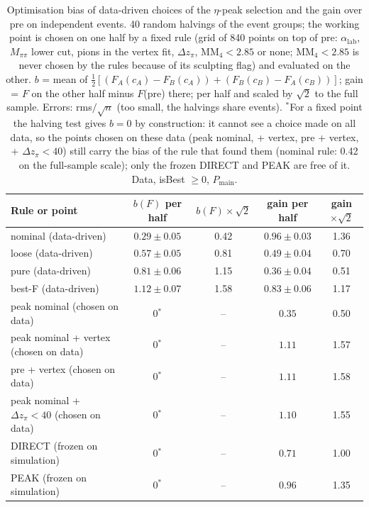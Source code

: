 \begin{table}[H]
\centering\small
\setlength{\tabcolsep}{4pt}
\caption{Optimisation bias of data-driven choices of the $\eta$-peak selection and the gain over pre on independent events. 40 random halvings of the event groups; the working point is chosen on one half by a fixed rule (grid of 840 points on top of pre: $\alpha_\mathrm{lab}$, $M_{\pi\pi}$ lower cut, pions in the vertex fit, $\Delta z_\pi$, MM$_4<2.85$ or none; MM$_4<2.85$ is never chosen by the rules because of its sculpting flag) and evaluated on the other. $b$ = mean of $\frac12[(F_A(c_A)-F_B(c_A))+(F_B(c_B)-F_A(c_B))]$; gain = $F$ on the other half minus $F$(pre) there; per half and scaled by $\sqrt2$ to the full sample. Errors: rms$/\sqrt{n}$ (too small, the halvings share events). $^*$For a fixed point the halving test gives $b=0$ by construction: it cannot see a choice made on all data, so the points chosen on these data (peak nominal, + vertex, pre + vertex, + $\Delta z_\pi<40$) still carry the bias of the rule that found them (nominal rule: 0.42 on the full-sample scale); only the frozen DIRECT and PEAK are free of it. Data, isBest $\geq0$, $P_\mathrm{main}$.}
\label{tab:opt_bias}
\begin{tabular}{lcccc}
\toprule
Rule or point & $b(F)$ per half & $b(F)\times\sqrt2$ & gain per half & gain $\times\sqrt2$ \\
\midrule
nominal (data-driven) & $0.29\pm0.05$ & 0.42 & $0.96\pm0.03$ & 1.36 \\
loose (data-driven) & $0.57\pm0.05$ & 0.81 & $0.49\pm0.04$ & 0.70 \\
pure (data-driven) & $0.81\pm0.06$ & 1.15 & $0.36\pm0.04$ & 0.51 \\
best-F (data-driven) & $1.12\pm0.07$ & 1.58 & $0.83\pm0.06$ & 1.17 \\
\midrule
peak nominal (chosen on data) & 0$^*$ & -- & $0.35$ & 0.50 \\
peak nominal + vertex (chosen on data) & 0$^*$ & -- & $1.11$ & 1.57 \\
pre + vertex (chosen on data) & 0$^*$ & -- & $1.11$ & 1.58 \\
peak nominal + $\Delta z_\pi<40$ (chosen on data) & 0$^*$ & -- & $1.10$ & 1.55 \\
DIRECT (frozen on simulation) & 0$^*$ & -- & $0.71$ & 1.00 \\
PEAK (frozen on simulation) & 0$^*$ & -- & $0.96$ & 1.35 \\
\bottomrule
\end{tabular}
\end{table}
